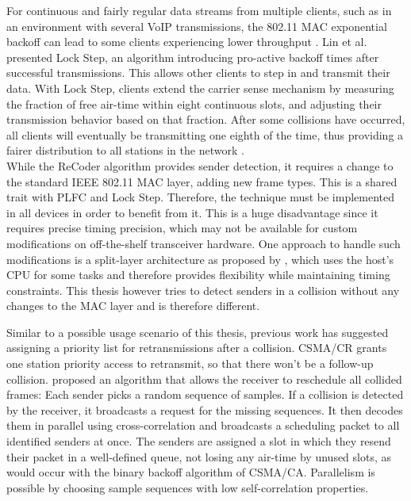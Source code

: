For continuous and fairly regular data streams from multiple clients, such as in an environment with several VoIP transmissions, the 802.11 \gls{MAC} exponential backoff can lead to some clients experiencing lower throughput \cite{lin2009}. Lin et al. presented Lock Step, an algorithm introducing pro-active backoff times after successful transmissions. This allows other clients to step in and transmit their data. With Lock Step, clients extend the carrier sense mechanism by measuring the fraction of free air-time within eight continuous slots, and adjusting their transmission behavior based on that fraction. After some collisions have occurred, all clients will eventually be transmitting one eighth of the time, thus providing a fairer distribution to all stations in the network \cite{lin2009}.\\

While the ReCoder algorithm provides sender detection, it requires a change to the standard IEEE 802.11 \gls{MAC} layer, adding new frame types. This is a shared trait with \gls{PLFC} and Lock Step. Therefore, the technique must be implemented in all devices in order to benefit from it. This is a huge disadvantage since it requires precise timing precision, which may not be available for custom modifications on off-the-shelf transceiver hardware. One approach to handle such modifications is a split-layer architecture as proposed by \cite{nychis2009}, which uses the host's CPU for some tasks and therefore provides flexibility while maintaining timing constraints. This thesis however tries to detect senders in a collision without any changes to the \gls{MAC} layer and is therefore different.

Similar to a possible usage scenario of this thesis, previous work has suggested assigning a priority list for retransmissions after a collision. \gls{CSMA/CR} \cite{choi2013} grants one station priority access to retransmit, so that there won't be a follow-up collision. \cite{zhao2015} proposed an algorithm that allows the receiver to reschedule all collided frames: Each sender picks a random sequence of samples. If a collision is detected by the receiver, it broadcasts a request for the missing sequences. It then decodes them in parallel using cross-correlation and broadcasts a scheduling packet to all identified senders at once. The senders are assigned a slot in which they resend their packet in a well-defined queue, not losing any air-time by unused slots, as would occur with the binary backoff algorithm of \gls{CSMA/CA}. Parallelism is possible by choosing sample sequences with low self-correlation properties.


